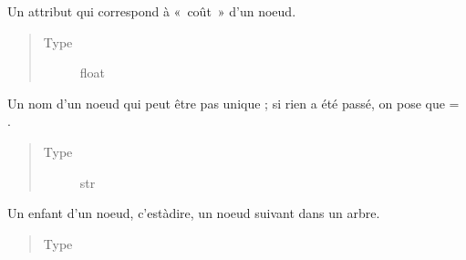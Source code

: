 \documentclass[letterpaper,10pt,french]{sphinxmanual}
\begin{document}
\begin{fulllineitems}
\begin{fulllineitems}
\begin{quote}
\begin{description}
\end{description}\end{quote}

\end{fulllineitems}


\begin{fulllineitems}
\label{\detokenize{index:StrategyTree.Repair._cost}}
Un attribut qui correspond à « coût » d’un noeud.
\begin{quote}\begin{description}
\item[{Type}] \leavevmode
float

\end{description}\end{quote}

\end{fulllineitems}


\begin{fulllineitems}
\label{\detokenize{index:StrategyTree.Repair._name}}
Un nom d’un noeud qui peut être pas unique ; si rien a été passé, on pose que  = .
\begin{quote}\begin{description}
\item[{Type}] \leavevmode
str

\end{description}\end{quote}

\end{fulllineitems}


\begin{fulllineitems}
\label{\detokenize{index:StrategyTree.Repair._child}}
Un enfant d’un noeud, c’est\sphinxhyphen{}à\sphinxhyphen{}dire, un noeud suivant dans un arbre.
\begin{quote}\begin{description}
\item[{Type}] \leavevmode
{\hyperref[\detokenize{index:StrategyTree.NodeST}]{}}


\end{description}
\end{quote}
\end{fulllineitems}
\end{fulllineitems}
\end{document}
